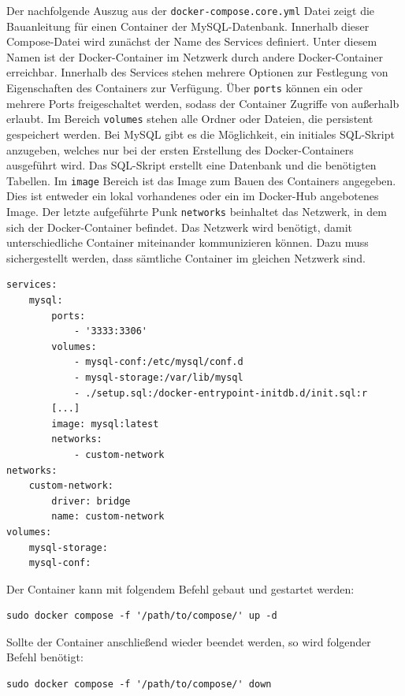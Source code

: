 Der nachfolgende Auszug aus der \texttt{docker-compose.core.yml} Datei zeigt die Bauanleitung für einen Container der MySQL-Datenbank. Innerhalb dieser Compose-Datei wird zunächst der Name des Services definiert. Unter diesem Namen ist der Docker-Container im Netzwerk durch andere Docker-Container erreichbar. Innerhalb des Services stehen mehrere Optionen zur Festlegung von Eigenschaften des Containers zur Verfügung. Über \texttt{ports} können ein oder mehrere Ports freigeschaltet werden, sodass der Container Zugriffe von außerhalb erlaubt. Im Bereich \texttt{volumes} stehen alle Ordner oder Dateien, die persistent gespeichert werden. Bei MySQL gibt es die Möglichkeit, ein initiales SQL-Skript anzugeben, welches nur bei der ersten Erstellung des Docker-Containers ausgeführt wird. Das SQL-Skript erstellt eine Datenbank und die benötigten Tabellen. Im \texttt{image} Bereich ist das Image zum Bauen des Containers angegeben. Dies ist entweder ein lokal vorhandenes oder ein im Docker-Hub angebotenes Image. Der letzte aufgeführte Punk \texttt{networks} beinhaltet das Netzwerk, in dem sich der Docker-Container befindet. Das Netzwerk wird benötigt, damit unterschiedliche Container miteinander kommunizieren können. Dazu muss sichergestellt werden, dass sämtliche Container im gleichen Netzwerk sind.

\begin{lstlisting}[caption={Docker-Compose-Datei zum Aufsetzen und Starten der Container}]
services:
    mysql: 
        ports: 
            - '3333:3306'
        volumes: 
            - mysql-conf:/etc/mysql/conf.d
            - mysql-storage:/var/lib/mysql
            - ./setup.sql:/docker-entrypoint-initdb.d/init.sql:r
        [...]
        image: mysql:latest
        networks:
            - custom-network
networks: 
    custom-network:
        driver: bridge
        name: custom-network
volumes:
    mysql-storage:
    mysql-conf:
\end{lstlisting}

Der Container kann mit folgendem Befehl gebaut und gestartet werden:
\begin{lstlisting}[caption={Starten eines Docker-Containers}]
sudo docker compose -f '/path/to/compose/' up -d
\end{lstlisting}

Sollte der Container anschließend wieder beendet werden, so wird folgender Befehl benötigt: 
\begin{lstlisting}[caption={Beenden eines Docker-Containers}]
sudo docker compose -f '/path/to/compose/' down
\end{lstlisting}